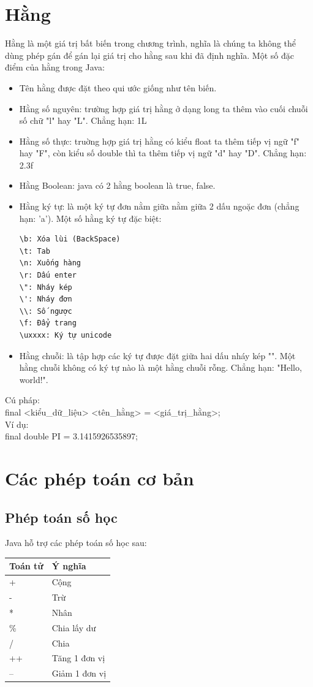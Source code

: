 \section{Hằng}
\indent Hằng là một giá trị bất biến trong chương trình, nghĩa là chúng ta không thể dùng phép gán để gán lại giá trị cho hằng sau khi đã định nghĩa. Một số đặc điểm của hằng trong Java:
\begin{itemize}
\item Tên hằng được đặt theo qui ước giống như tên biến.
\item Hằng số nguyên: trường hợp giá trị hằng ở dạng long ta thêm vào cuối chuỗi số chữ "l" hay "L". Chẳng hạn: 1L
\item Hằng số thực: truờng hợp giá trị hằng có kiểu float ta thêm tiếp vị ngữ "f" hay "F", còn kiểu số double thì ta thêm tiếp vị ngữ "d" hay "D". Chẳng hạn: 2.3f
\item Hằng Boolean: java có 2 hằng boolean là {\ttfamily true, false}.
\item Hằng ký tự: là một ký tự đơn nằm giữa nằm giữa 2 dấu ngoặc đơn (chẳng hạn: 'a'). Một số hằng ký tự đặc biệt:

\begin{verbatim}
\b: Xóa lùi (BackSpace)
\t: Tab
\n: Xuống hàng
\r: Dấu enter
\": Nháy kép
\': Nháy đơn
\\: Số ngược
\f: Đẩy trang
\uxxxx: Ký tự unicode
\end{verbatim}

\item Hằng chuỗi: là tập hợp các ký tự được đặt giữa hai dấu nháy kép "". Một hằng chuỗi không có ký tự nào là một hằng chuỗi rỗng. Chẳng hạn: "Hello, world!".
\end{itemize}

\indent Cú pháp:\\
{\ttfamily final <kiểu\_dữ\_liệu> <tên\_hằng> = <giá\_trị\_hằng>; }\\
\indent Ví dụ:\\
{\ttfamily final double PI = 3.1415926535897;}
\section{Các phép toán cơ bản}
\subsection{Phép toán số học}
\indent Java hỗ trợ các phép toán số học sau:
\begin{center}
\centering
\begin{tabular}{ ll}
\hline
Toán tử&Ý nghĩa\\
\hline
+ &Cộng\\
\hline
- & Trừ\\
\hline
* & Nhân\\
\hline 
\% & Chia lấy dư\\
\hline
/ & Chia\\

\hline
++ & Tăng 1 đơn vị\\
\hline
-- & Giảm 1 đơn vị\\
\hline
\end{tabular}
\end{center}

